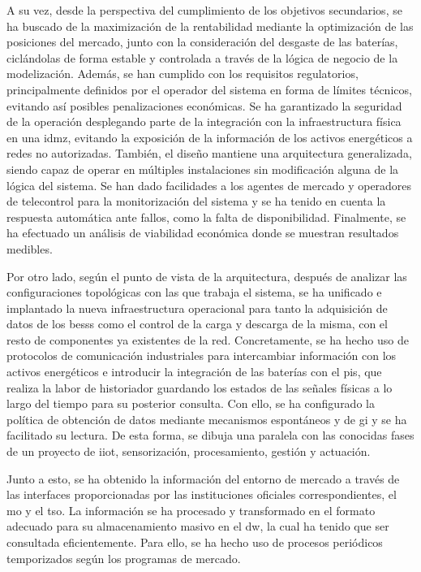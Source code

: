 A su vez, desde la perspectiva del cumplimiento de los objetivos secundarios, se ha buscado de la maximización de la rentabilidad mediante la optimización de las posiciones del mercado, junto con la consideración del desgaste de las baterías, ciclándolas de forma estable y controlada a través de la lógica de negocio de la modelización. Además, se han cumplido con los requisitos regulatorios, principalmente definidos por el operador del sistema en forma de límites técnicos, evitando así posibles penalizaciones económicas. Se ha garantizado la seguridad de la operación desplegando parte de la integración con la infraestructura física en una \gls{idmz}, evitando la exposición de la información de los activos energéticos a redes no autorizadas. También, el diseño mantiene una arquitectura generalizada, siendo capaz de operar en múltiples instalaciones sin modificación alguna de la lógica del sistema. Se han dado facilidades a los agentes de mercado y operadores de telecontrol para la monitorización del sistema y se ha tenido en cuenta la respuesta automática ante fallos, como la falta de disponibilidad. Finalmente, se ha efectuado un análisis de viabilidad económica donde se muestran resultados medibles.

Por otro lado, según el punto de vista de la arquitectura, después de analizar las configuraciones topológicas con las que trabaja el sistema, se ha unificado e implantado la nueva infraestructura operacional para tanto la adquisición de datos de los \glspl{bess} como el control de la carga y descarga de la misma, con el resto de componentes ya existentes de la red. Concretamente, se ha hecho uso de protocolos de comunicación industriales para intercambiar información con los activos energéticos e introducir la integración de las baterías con el \gls{pis}, que realiza la labor de historiador guardando los estados de las señales físicas a lo largo del tiempo para su posterior consulta. Con ello, se ha configurado la política de obtención de datos mediante mecanismos espontáneos y de \gls{gi} y se ha facilitado su lectura. De esta forma, se dibuja una paralela con las conocidas fases de un proyecto de \gls{iiot}, sensorización, procesamiento, gestión y actuación.

Junto a esto, se ha obtenido la información del entorno de mercado a través de las interfaces proporcionadas por las instituciones oficiales correspondientes, el \gls{mo} y el \gls{tso}. La información se ha procesado y transformado en el formato adecuado para su almacenamiento masivo en el \gls{dw}, la cual ha tenido que ser consultada eficientemente. Para ello, se ha hecho uso de procesos periódicos temporizados según los programas de mercado.

